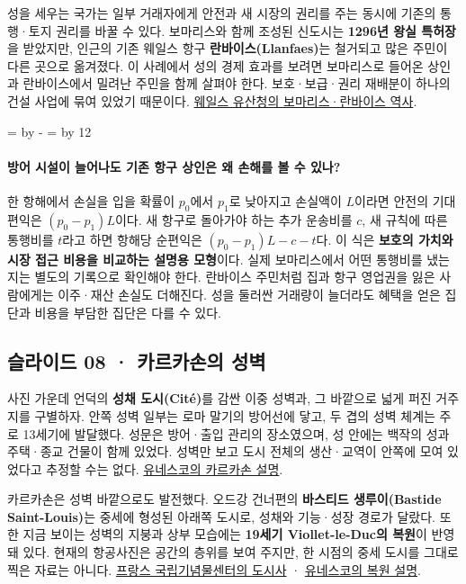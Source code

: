 \documentclass[10pt,a4paper]{article}
\newcommand{\ReserveQuestionSpace}{%
  \par\begingroup
  \dimen0=\pagegoal \advance\dimen0 by -\pagetotal
  \dimen2=\baselineskip \multiply\dimen2 by 12
  \ifdim\dimen0<\dimen2 \newpage\fi
  \endgroup}
\begin{document}
성을 세우는 국가는 일부 거래자에게 안전과 새 시장의 권리를 주는 동시에 기존의 통행·토지 권리를 바꿀 수 있다. 보마리스와 함께 조성된 신도시는 \textbf{1296년 왕실 특허장}을 받았지만, 인근의 기존 웨일스 항구 \textbf{란바이스(Llanfaes)}는 철거되고 많은 주민이 다른 곳으로 옮겨졌다. 이 사례에서 성의 경제 효과를 보려면 보마리스로 들어온 상인과 란바이스에서 밀려난 주민을 함께 살펴야 한다. 보호·보급·권리 재배분이 하나의 건설 사업에 묶여 있었기 때문이다. \href{https://cadw.gov.wales/more-about-beaumaris-castle}{웨일스 유산청의 보마리스·란바이스 역사}.\par

\ReserveQuestionSpace
\paragraph{방어 시설이 늘어나도 기존 항구 상인은 왜 손해를 볼 수 있나?}
한 항해에서 손실을 입을 확률이 $p_0$에서 $p_1$로 낮아지고 손실액이 $L$이라면 안전의 기대 편익은 $(p_0-p_1)L$이다. 새 항구로 돌아가야 하는 추가 운송비를 $c$, 새 규칙에 따른 통행비를 $t$라고 하면 항해당 순편익은 $(p_0-p_1)L-c-t$다. 이 식은 \textbf{보호의 가치와 시장 접근 비용을 비교하는 설명용 모형}이다. 실제 보마리스에서 어떤 통행비를 냈는지는 별도의 기록으로 확인해야 한다. 란바이스 주민처럼 집과 항구 영업권을 잃은 사람에게는 이주·재산 손실도 더해진다. 성을 둘러싼 거래량이 늘더라도 혜택을 얻은 집단과 비용을 부담한 집단은 다를 수 있다.\par

\subsection{슬라이드 08 · 카르카손의 성벽}
사진 가운데 언덕의 \textbf{성채 도시(Cité)}를 감싼 이중 성벽과, 그 바깥으로 넓게 퍼진 거주지를 구별하자. 안쪽 성벽 일부는 로마 말기의 방어선에 닿고, 두 겹의 성벽 체계는 주로 13세기에 발달했다. 성문은 방어·출입 관리의 장소였으며, 성 안에는 백작의 성과 주택·종교 건물이 함께 있었다. 성벽만 보고 도시 전체의 생산·교역이 안쪽에 모여 있었다고 추정할 수는 없다. \href{https://whc.unesco.org/en/list/345}{유네스코의 카르카손 설명}.\par

카르카손은 성벽 바깥으로도 발전했다. 오드강 건너편의 \textbf{바스티드 생루이(Bastide Saint-Louis)}는 중세에 형성된 아래쪽 도시로, 성채와 기능·성장 경로가 달랐다. 또한 지금 보이는 성벽의 지붕과 상부 모습에는 \textbf{19세기 Viollet-le-Duc의 복원}이 반영돼 있다. 현재의 항공사진은 공간의 층위를 보여 주지만, 한 시점의 중세 도시를 그대로 찍은 자료는 아니다. \href{https://www.monuments-nationaux.fr/en/editions-du-patrimoine/books/the-city-of-carcassonne}{프랑스 국립기념물센터의 도시사} · \href{https://whc.unesco.org/en/list/345}{유네스코의 복원 설명}.\par
\end{document}
